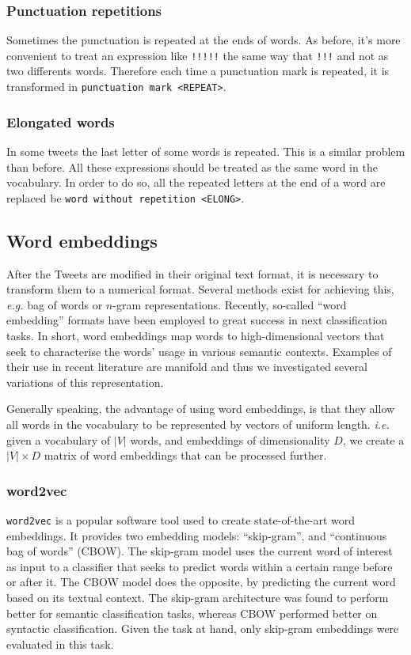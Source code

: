 \subsubsection{Punctuation repetitions}
Sometimes the punctuation is repeated at the ends of words. As before, it's more convenient to treat an expression like \texttt{!!!!!} the same way that \texttt{!!!} and not as two differents words. Therefore each time a punctuation mark is repeated, it is transformed in \texttt{punctuation mark <REPEAT>}. 

\subsubsection{Elongated words}
In some tweets the last letter of some words is repeated. This is a similar problem than before. All these expressions should be treated as the same word in the vocabulary. In order to do so, all the repeated letters at the end of a word are replaced be \texttt{word without repetition <ELONG>}.

\subsection{Word embeddings}
After the Tweets are modified in their original text format, it is necessary to transform them to a numerical format. Several methods exist for achieving this, \emph{e.g.} bag of words or $n$-gram representations. Recently, so-called ``word embedding'' formats \cite{} have been employed to great success in next classification tasks. In short, word embeddings map words to high-dimensional vectors that seek to characterise the words' usage in various semantic contexts. \cite{} Examples of their use in recent literature are manifold \cite{} and thus we investigated several variations of this representation.

Generally speaking, the advantage of using word embeddings, is that they allow all words in the vocabulary to be represented by vectors of uniform length. \emph{i.e.} given a vocabulary of $|V|$ words, and embeddings of dimensionality $D$, we create a $|V| \times D$ matrix of word embeddings that can be processed further.

\subsubsection{word2vec}
\texttt{word2vec} is a popular software tool used to create state-of-the-art word embeddings. \cite{mikolov2013distributed} It provides two embedding models: ``skip-gram'', and ``continuous bag of words'' (CBOW). The skip-gram model uses the current word of interest as input to a classifier that seeks to predict words within a certain range before or after it. The CBOW model does the opposite, by predicting the current word based on its textual context. The skip-gram architecture was found to perform better for semantic classification tasks, whereas CBOW performed better on syntactic classification. \cite{mikolov2013efficient} Given the task at hand, only skip-gram embeddings were evaluated in this task.

